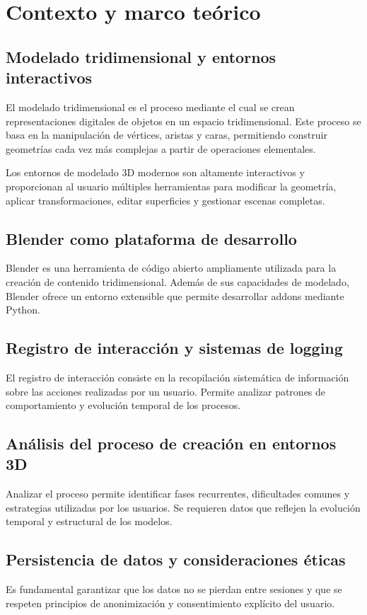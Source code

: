 \chapter{Contexto y marco teórico}

\section{Modelado tridimensional y entornos interactivos}

El modelado tridimensional es el proceso mediante el cual se crean representaciones digitales de objetos en un espacio tridimensional. Este proceso se basa en la manipulación de vértices, aristas y caras, permitiendo construir geometrías cada vez más complejas a partir de operaciones elementales.

Los entornos de modelado 3D modernos son altamente interactivos y proporcionan al usuario múltiples herramientas para modificar la geometría, aplicar transformaciones, editar superficies y gestionar escenas completas.

\section{Blender como plataforma de desarrollo}

Blender es una herramienta de código abierto ampliamente utilizada para la creación de contenido tridimensional. Además de sus capacidades de modelado, Blender ofrece un entorno extensible que permite desarrollar addons mediante Python.

\section{Registro de interacción y sistemas de logging}

El registro de interacción consiste en la recopilación sistemática de información sobre las acciones realizadas por un usuario. Permite analizar patrones de comportamiento y evolución temporal de los procesos.

\section{Análisis del proceso de creación en entornos 3D}

Analizar el proceso permite identificar fases recurrentes, dificultades comunes y estrategias utilizadas por los usuarios. Se requieren datos que reflejen la evolución temporal y estructural de los modelos.

\section{Persistencia de datos y consideraciones éticas}

Es fundamental garantizar que los datos no se pierdan entre sesiones y que se respeten principios de anonimización y consentimiento explícito del usuario.
